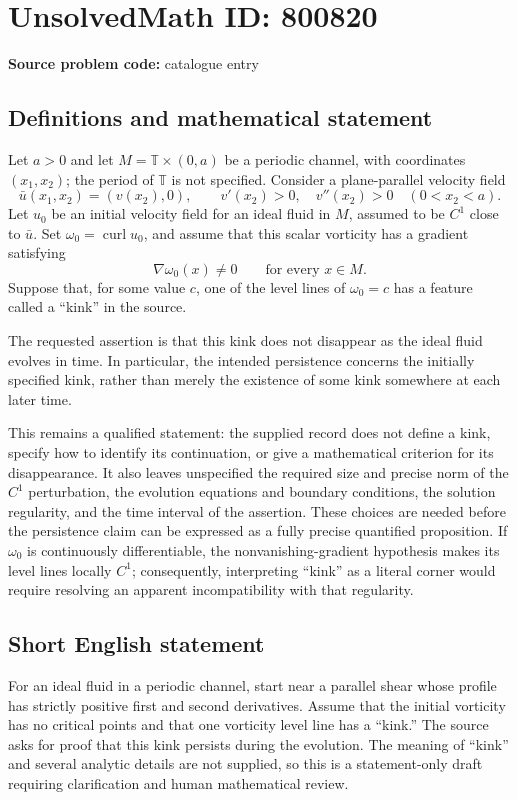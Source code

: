 \documentclass[11pt]{article}
\begin{document}
\section*{UnsolvedMath ID: 800820}
\textbf{Source problem code:} catalogue entry
\subsection{Definitions and mathematical statement}
Let \(a>0\) and let \(M=\mathbb T\times(0,a)\) be a periodic channel, with coordinates \((x_1,x_2)\); the period of \(\mathbb T\) is not specified. Consider a plane-parallel velocity field
\[
\bar u(x_1,x_2)=(v(x_2),0),\qquad v'(x_2)>0,\quad v''(x_2)>0\quad(0<x_2<a).
\]
Let \(u_0\) be an initial velocity field for an ideal fluid in \(M\), assumed to be \(C^1\) close to \(\bar u\). Set \(\omega_0=\operatorname{curl}u_0\), and assume that this scalar vorticity has a gradient satisfying
\[
\nabla\omega_0(x)\ne0\qquad\text{for every }x\in M.
\]
Suppose that, for some value \(c\), one of the level lines of \(\omega_0=c\) has a feature called a ``kink'' in the source.

The requested assertion is that this kink does not disappear as the ideal fluid evolves in time. In particular, the intended persistence concerns the initially specified kink, rather than merely the existence of some kink somewhere at each later time.

This remains a qualified statement: the supplied record does not define a kink, specify how to identify its continuation, or give a mathematical criterion for its disappearance. It also leaves unspecified the required size and precise norm of the \(C^1\) perturbation, the evolution equations and boundary conditions, the solution regularity, and the time interval of the assertion. These choices are needed before the persistence claim can be expressed as a fully precise quantified proposition. If \(\omega_0\) is continuously differentiable, the nonvanishing-gradient hypothesis makes its level lines locally \(C^1\); consequently, interpreting ``kink'' as a literal corner would require resolving an apparent incompatibility with that regularity.
\subsection{Short English statement}
For an ideal fluid in a periodic channel, start near a parallel shear whose profile has strictly positive first and second derivatives. Assume that the initial vorticity has no critical points and that one vorticity level line has a ``kink.'' The source asks for proof that this kink persists during the evolution. The meaning of ``kink'' and several analytic details are not supplied, so this is a statement-only draft requiring clarification and human mathematical review.
\end{document}
